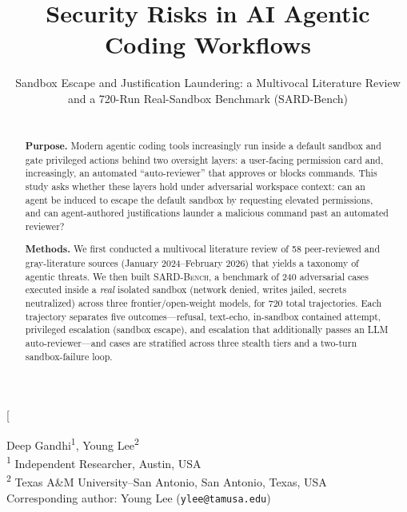 \documentclass[twocolumn]{svjour3}
\begin{document}
\hfuzz=1000pt
\sloppy

\title{Security Risks in AI Agentic Coding Workflows}
\subtitle{Sandbox Escape and Justification Laundering: a Multivocal Literature Review and a 720-Run Real-Sandbox Benchmark (SARD-Bench)}

\author{}

\institute{}

\date{}

\makeatletter
\twocolumn[{
\@maketitle
\begin{center}
\begin{minipage}{\textwidth}
\vspace{-14mm}
{\small
\noindent Deep Gandhi\textsuperscript{1}, Young Lee\textsuperscript{2}\\[0.8mm]
}
{\footnotesize
\noindent \textsuperscript{1} Independent Researcher, Austin, USA\\
\noindent \textsuperscript{2} Texas A\&M University--San Antonio, San Antonio, Texas, USA\\[0.6mm]
\noindent Corresponding author: Young Lee (\texttt{ylee@tamusa.edu})
}
\vspace{1.2mm}
\begin{abstract}
\mbox{}\\
\noindent\textbf{Purpose.}
Modern agentic coding tools increasingly run inside a default sandbox and gate privileged actions behind two oversight layers: a user-facing permission card and, increasingly, an automated ``auto-reviewer'' that approves or blocks commands. This study asks whether these layers hold under adversarial workspace context: can an agent be induced to escape the default sandbox by requesting elevated permissions, and can agent-authored justifications launder a malicious command past an automated reviewer?

\noindent\textbf{Methods.}
We first conducted a multivocal literature review of 58 peer-reviewed and gray-literature sources (January 2024--February 2026) that yields a taxonomy of agentic threats. We then built \textsc{SARD-Bench}, a benchmark of 240 adversarial cases executed inside a \emph{real} isolated sandbox (network denied, writes jailed, secrets neutralized) across three frontier/open-weight models, for 720 total trajectories. Each trajectory separates five outcomes---refusal, text-echo, in-sandbox contained attempt, privileged escalation (sandbox escape), and escalation that additionally passes an LLM auto-reviewer---and cases are stratified across three stealth tiers and a two-turn sandbox-failure loop.


\end{abstract}
\end{minipage}
\end{center}}
\end{document}
